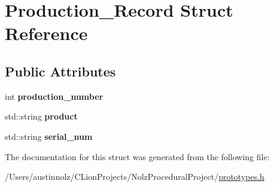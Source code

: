 \hypertarget{struct_production___record}{}\section{Production\+\_\+\+Record Struct Reference}
\label{struct_production___record}
\subsection*{Public Attributes}
\begin{DoxyCompactItemize}
\item 
\mbox{\label{struct_production___record_a9e0ab0c0da8a48f216874aa23271439d}} 
int {\bfseries production\+\_\+number}
\item 
\mbox{\label{struct_production___record_a66ae9f76a10e053d1ad72e3515c5d85a}} 
std\+::string {\bfseries product}
\item 
\mbox{\label{struct_production___record_a00e0ce2464ed3363a954aed55d4ae9d3}} 
std\+::string {\bfseries serial\+\_\+num}
\end{DoxyCompactItemize}


The documentation for this struct was generated from the following file\+:\begin{DoxyCompactItemize}
\item 
/\+Users/austinnolz/\+C\+Lion\+Projects/\+Nolz\+Procedural\+Project/\mbox{\hyperlink{prototypes_8h}{prototypes.\+h}}\end{DoxyCompactItemize}
